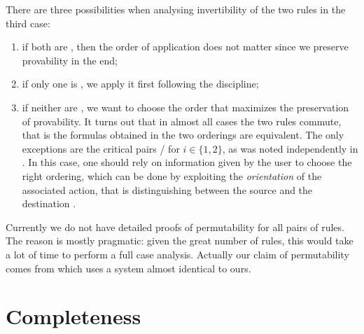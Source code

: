\begin{scope}
There are three possibilities when analysing invertibility of the two rules in
the third case:
\begin{enumerate}
  \item if both are , then the order of application does not matter
  since we preserve provability in the end;
  \item if only one is , we apply it first following the 
  discipline;
  \item if neither are , we want to choose the order that
  maximizes the preservation of provability. It turns out that in almost all
  cases the two rules commute, that is the formulas obtained in the two
  orderings are equivalent. The only exceptions are the critical pairs
  / for $i \in \{1,2\}$, as was noted
  independently in . In this case, one
  should rely on information given by the user to choose the right ordering,
  which can be done by exploiting the \emph{orientation} of the associated
   action, that is distinguishing between the source  and the
  destination .
\end{enumerate}

\begin{remark}
Currently we do not have detailed proofs of permutability for all pairs of
rules. The reason is mostly pragmatic: given the great number of rules, this
would take a lot of time to perform a full case analysis. Actually our claim of
permutability comes from \cite{DBLP:conf/cade/Chaudhuri21} which uses a
 system almost identical to ours.
\end{remark}

\section{Completeness}


\end{scope}
